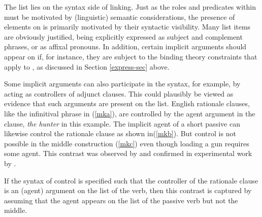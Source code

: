 \documentclass[output=paper
                ,modfonts
                ,nonflat
	        ,collection
	        ,collectionchapter
	        ,collectiontoclongg
 	        ,biblatex
                ,babelshorthands
                ,newtxmath
                ,draftmode
                ,colorlinks, citecolor=brown
]{./langsci/langscibook}
\begin{document}
The \argst list lies on the syntax side of linking.  Just as the roles and predicates within \content must be motivated by (linguistic) semantic considerations, the presence of elements on \argst is primarily motivated by their syntactic visibility.  Many \argst list items are obviously justified, being explicitly expressed as subject and complement phrases, or as affixal pronouns.  In addition, certain implicit arguments should appear on \argst if, for instance, they are subject to the binding theory constraints that apply to \argst, as discussed in Section \ref{express-sec} above.

Some implicit arguments can also participate in the syntax, for example, by acting as controllers of adjunct clauses.  This could plausibly be viewed as evidence that such arguments are present on the \argst list.
English rationale clauses, like the infinitival phrase in (\ref{mka}), are controlled  by the agent argument in the clause, \textit{the hunter} in this example.
The implicit agent of a short passive  can likewise control the rationale clause as shown in(\ref{mkb}).
But control is not possible in the middle construction (\ref{mkc}) even though loading a gun requires some agent.
This contrast was observed by \citet{KeyserandRoeper1984} and confirmed in experimental work by \citet{MaunerandKoenig2000}.  

\begin{exe}
\ex\label{mk}
\begin{xlist}
\end{xlist}
\end{exe}



\noindent
If the syntax of control  is specified such that the controller of the rationale clause is an (agent) argument on the \argst list of the verb, then this contrast is captured by assuming that the agent appears on the \argst list of the passive verb but not the middle.
\end{document}
